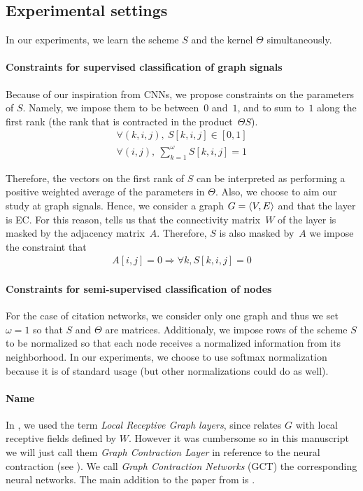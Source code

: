 \subsection{Experimental settings}
In our experiments, we learn the scheme $S$ and the kernel $\Theta$ simultaneously.

\paragraph{Constraints for supervised classification of graph signals}

Because of our inspiration from CNNs, we propose constraints on the parameters of $S$. Namely, we impose them to be between~$0$ and~$1$, and to sum to~$1$ along the first rank (the rank that is contracted in the product~$\Theta S$).
\begin{gather}
\forall (k,i,j),~S[k,i,j] \in [0,1]\\
\forall (i,j),~\displaystyle \sum_{k=1}^\omega S[k,i,j] = 1
\end{gather}

Therefore, the vectors on the first rank of $S$ can be interpreted as performing a positive weighted average of the parameters in $\Theta$.
Also, we choose to aim our study at graph signals. Hence, we consider a graph $G = \langle V, E \rangle$ and that the layer is EC. For this reason,  tells us that the connectivity matrix~$W$ of the layer is masked by the adjacency matrix~$A$. Therefore, $S$ is also masked by~$A$ \ie we impose the constraint that
\begin{gather}
A[i,j] = 0 \Rightarrow \forall k, S[k,i,j] = 0
\end{gather}

\paragraph{Constraints for semi-supervised classification of nodes}

For the case of citation networks, we consider only one graph and thus we set $\omega = 1$ so that $S$ and $\Theta$ are matrices. Additionaly, we impose rows of the scheme $S$ to be normalized so that each node receives a normalized information from its neighborhood. In our experiments, we choose to use softmax normalization because it is of standard usage (but other normalizations could do as well).

\paragraph{Name}
In \citep{vialatte2017learning}, we used the term \emph{Local Receptive Graph layers}, since  relates $G$ with local receptive fields defined by $W$. However it was cumbersome so in this manuscript we will just call them \emph{Graph Contraction Layer} in reference to the neural contraction (see ). We call \emph{Graph Contraction Networks} (GCT) the corresponding neural networks. The main addition to the paper \citep{vialatte2017learning} from  is .


